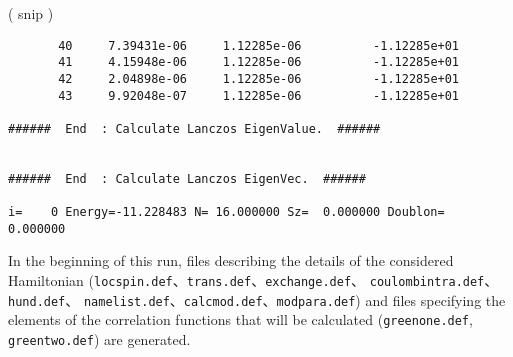 \normalsize
( snip )
\small
\begin{verbatim}
       40     7.39431e-06     1.12285e-06          -1.12285e+01
       41     4.15948e-06     1.12285e-06          -1.12285e+01
       42     2.04898e-06     1.12285e-06          -1.12285e+01
       43     9.92048e-07     1.12285e-06          -1.12285e+01

######  End  : Calculate Lanczos EigenValue.  ######


######  End  : Calculate Lanczos EigenVec.  ######

i=    0 Energy=-11.228483 N= 16.000000 Sz=  0.000000 Doublon=  0.000000
\end{verbatim}
\normalsize

In the beginning of this run,
files describing the details of the considered Hamiltonian 
(\verb|locspin.def|、\verb|trans.def|、\verb|exchange.def|、
\verb|coulombintra.def|、\verb|hund.def|、
\verb|namelist.def|、\verb|calcmod.def|、\verb|modpara.def|)
and files specifying the elements of the correlation functions
that will be calculated
(\verb|greenone.def|, \verb|greentwo.def|)
are generated.

%
%

